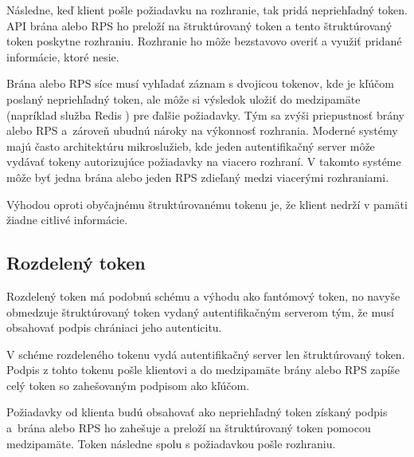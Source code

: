 Následne, keď klient pošle požiadavku na rozhranie, tak pridá nepriehľadný token. API brána alebo RPS ho preloží na štruktúrovaný token a tento štruktúrovaný token poskytne rozhraniu. Rozhranie ho môže bezstavovo overiť a využiť pridané informácie, ktoré nesie.

Brána alebo RPS síce musí vyhľadať záznam s dvojicou tokenov, kde je kľúčom poslaný nepriehľadný token, ale môže si výsledok uložiť do medzipamäte (napríklad služba Redis \cite{redis}) pre ďalšie požiadavky. Tým sa zvýši priepustnosť brány alebo RPS a~zároveň ubudnú nároky na výkonnosť rozhrania. Moderné systémy majú často architektúru mikroslužieb, kde jeden autentifikačný server môže vydávať tokeny autorizujúce požiadavky na viacero rozhraní. V takomto systéme môže byť jedna brána alebo jeden RPS zdieľaný medzi viacerými rozhraniami.

Výhodou oproti obyčajnému štruktúrovanému tokenu je, že klient nedrží v pamäti žiadne citlivé informácie.


\subsection{Rozdelený token}

Rozdelený token \cite{split_token} má podobnú schému a výhodu ako fantómový token, no navyše obmedzuje štruktúrovaný token vydaný autentifikačným serverom tým, že musí obsahovať podpis chrániaci jeho autenticitu.

V schéme rozdeleného tokenu vydá autentifikačný server len štruktúrovaný token. Podpis z tohto tokenu pošle klientovi a do medzipamäte brány alebo RPS zapíše celý token so zahešovaným podpisom ako kľúčom.

Požiadavky od klienta budú obsahovať ako nepriehľadný token získaný podpis a~brána alebo RPS ho zahešuje a preloží na štruktúrovaný token pomocou medzipamäte. Token následne spolu s požiadavkou pošle rozhraniu.